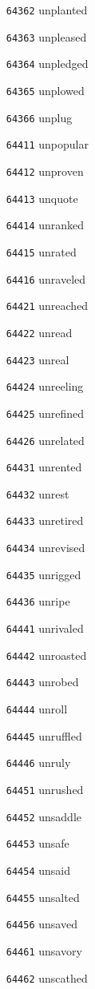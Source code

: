 \documentclass[twoside,11pt]{article}
\begin{document}
\begin{multicols}{5}
\begin{enumerate}
\item[\texttt{64362}] unplanted
\item[\texttt{64363}] unpleased
\item[\texttt{64364}] unpledged
\item[\texttt{64365}] unplowed
\item[\texttt{64366}] unplug
\item[\texttt{64411}] unpopular
\item[\texttt{64412}] unproven
\item[\texttt{64413}] unquote
\item[\texttt{64414}] unranked
\item[\texttt{64415}] unrated
\item[\texttt{64416}] unraveled
\item[\texttt{64421}] unreached
\item[\texttt{64422}] unread
\item[\texttt{64423}] unreal
\item[\texttt{64424}] unreeling
\item[\texttt{64425}] unrefined
\item[\texttt{64426}] unrelated
\item[\texttt{64431}] unrented
\item[\texttt{64432}] unrest
\item[\texttt{64433}] unretired
\item[\texttt{64434}] unrevised
\item[\texttt{64435}] unrigged
\item[\texttt{64436}] unripe
\item[\texttt{64441}] unrivaled
\item[\texttt{64442}] unroasted
\item[\texttt{64443}] unrobed
\item[\texttt{64444}] unroll
\item[\texttt{64445}] unruffled
\item[\texttt{64446}] unruly
\item[\texttt{64451}] unrushed
\item[\texttt{64452}] unsaddle
\item[\texttt{64453}] unsafe
\item[\texttt{64454}] unsaid
\item[\texttt{64455}] unsalted
\item[\texttt{64456}] unsaved
\item[\texttt{64461}] unsavory
\item[\texttt{64462}] unscathed

\end{enumerate}
\end{multicols}
\end{document}
